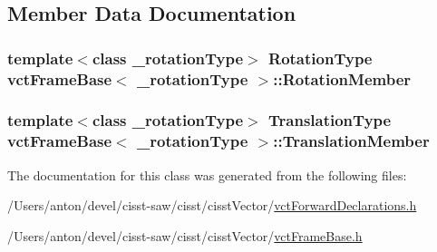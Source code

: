 \subsection{Member Data Documentation}
\hypertarget{classvct_frame_base_a686087937bca6d58cbfaf251736915b4}{}
\subsubsection[{Rotation\+Member}]{\setlength{\rightskip}{0pt plus 5cm}template$<$class \+\_\+rotation\+Type$>$ {\bf Rotation\+Type} {\bf vct\+Frame\+Base}$<$ \+\_\+rotation\+Type $>$\+::Rotation\+Member\hspace{0.3cm}{\ttfamily [protected]}}\label{classvct_frame_base_a686087937bca6d58cbfaf251736915b4}
\hypertarget{classvct_frame_base_a982d51cac7f38f898989db9f8ad3ff84}{}
\subsubsection[{Translation\+Member}]{\setlength{\rightskip}{0pt plus 5cm}template$<$class \+\_\+rotation\+Type$>$ {\bf Translation\+Type} {\bf vct\+Frame\+Base}$<$ \+\_\+rotation\+Type $>$\+::Translation\+Member\hspace{0.3cm}{\ttfamily [protected]}}\label{classvct_frame_base_a982d51cac7f38f898989db9f8ad3ff84}


The documentation for this class was generated from the following files\+:\begin{DoxyCompactItemize}
\item 
/\+Users/anton/devel/cisst-\/saw/cisst/cisst\+Vector/\hyperlink{vct_forward_declarations_8h}{vct\+Forward\+Declarations.\+h}\item 
/\+Users/anton/devel/cisst-\/saw/cisst/cisst\+Vector/\hyperlink{vct_frame_base_8h}{vct\+Frame\+Base.\+h}\end{DoxyCompactItemize}
